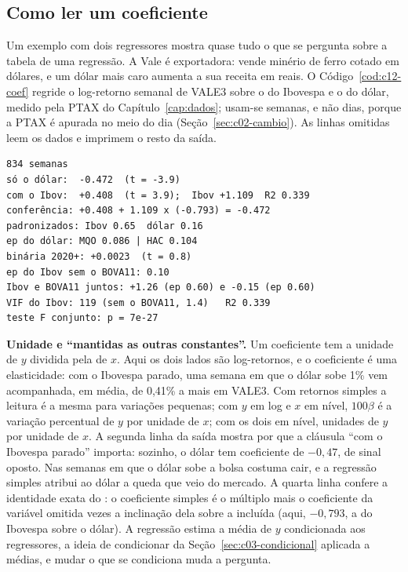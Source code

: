 \subsection{Como ler um coeficiente}
\label{sec:c12-coeficientes}

Um exemplo com dois regressores mostra quase tudo o que se pergunta sobre a tabela de uma regressão. A Vale é exportadora: vende minério de ferro cotado em dólares, e um dólar mais caro aumenta a sua receita em reais. O Código~\ref{cod:c12-coef} regride o log-retorno semanal de VALE3 sobre o do Ibovespa e o do dólar, medido pela PTAX do Capítulo~\ref{cap:dados}; usam-se semanas, e não dias, porque a PTAX é apurada no meio do dia (Seção~\ref{sec:c02-cambio}). As linhas omitidas leem os dados e imprimem o resto da saída.


\begin{lstlisting}[style=saida]
834 semanas
só o dólar:  -0.472  (t = -3.9)
com o Ibov:  +0.408  (t = 3.9);  Ibov +1.109  R2 0.339
conferência: +0.408 + 1.109 x (-0.793) = -0.472
padronizados: Ibov 0.65  dólar 0.16
ep do dólar: MQO 0.086 | HAC 0.104
binária 2020+: +0.0023  (t = 0.8)
ep do Ibov sem o BOVA11: 0.10
Ibov e BOVA11 juntos: +1.26 (ep 0.60) e -0.15 (ep 0.60)
VIF do Ibov: 119 (sem o BOVA11, 1.4)   R2 0.339
teste F conjunto: p = 7e-27
\end{lstlisting}

\textbf{Unidade e ``mantidas as outras constantes''.} Um coeficiente tem a unidade de $y$ dividida pela de $x$. Aqui os dois lados são log-retornos, e o coeficiente é uma elasticidade: com o Ibovespa parado, uma semana em que o dólar sobe 1\% vem acompanhada, em média, de 0,41\% a mais em VALE3. Com retornos simples a leitura é a mesma para variações pequenas; com $y$ em log e $x$ em nível, $100\beta$ é a variação percentual de $y$ por unidade de $x$; com os dois em nível, unidades de $y$ por unidade de $x$. A segunda linha da saída mostra por que a cláusula ``com o Ibovespa parado'' importa: sozinho, o dólar tem coeficiente de $-0,47$, de sinal oposto. Nas semanas em que o dólar sobe a bolsa costuma cair, e a regressão simples atribui ao dólar a queda que veio do mercado. A quarta linha confere a identidade exata do : o coeficiente simples é o múltiplo mais o coeficiente da variável omitida vezes a inclinação dela sobre a incluída (aqui, $-0,793$, a do Ibovespa sobre o dólar). A regressão estima a média de $y$ condicionada aos regressores, a ideia de condicionar da Seção~\ref{sec:c03-condicional} aplicada a médias, e mudar o que se condiciona muda a pergunta.

